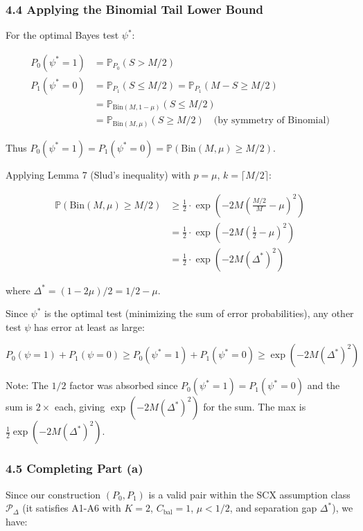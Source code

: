 \documentclass[
  12pt,
]{article}
\begin{document}
\subsubsection{4.4 Applying the Binomial Tail Lower
Bound}\label{applying-the-binomial-tail-lower-bound}

For the optimal Bayes test \(\psi^*\):

\[\begin{aligned}
P_0(\psi^* = 1) &= \mathbb{P}_{P_0}(S > M/2) \\
P_1(\psi^* = 0) &= \mathbb{P}_{P_1}(S \leq M/2) = \mathbb{P}_{P_1}(M - S \geq M/2) \\
&= \mathbb{P}_{\text{Bin}(M,1-\mu)}(S \leq M/2) \\
&= \mathbb{P}_{\text{Bin}(M,\mu)}(S \geq M/2) \quad \text{(by symmetry of Binomial)}
\end{aligned}\]

Thus
\(P_0(\psi^*=1) = P_1(\psi^*=0) = \mathbb{P}(\text{Bin}(M,\mu) \geq M/2)\).

Applying Lemma 7 (Slud's inequality) with \(p = \mu\),
\(k = \lceil M/2 \rceil\):

\[\begin{aligned}
\mathbb{P}(\text{Bin}(M,\mu) \geq M/2) &\geq \frac{1}{2} \cdot \exp\!\left(-2M\left(\frac{M/2}{M} - \mu\right)^2\right) \\
&= \frac{1}{2} \cdot \exp\!\left(-2M\left(\frac{1}{2} - \mu\right)^2\right) \\
&= \frac{1}{2} \cdot \exp\!\left(-2M(\Delta^*)^2\right)
\end{aligned}\]

where \(\Delta^* = (1-2\mu)/2 = 1/2 - \mu\).

Since \(\psi^*\) is the optimal test (minimizing the sum of error
probabilities), any other test \(\psi\) has error at least as large:

\[P_0(\psi=1) + P_1(\psi=0) \geq P_0(\psi^*=1) + P_1(\psi^*=0) \geq \exp(-2M(\Delta^*)^2)\]

Note: The \(1/2\) factor was absorbed since
\(P_0(\psi^*=1) = P_1(\psi^*=0)\) and the sum is \(2 \times\) each,
giving \(\exp(-2M(\Delta^*)^2)\) for the sum. The max is
\(\frac{1}{2}\exp(-2M(\Delta^*)^2)\).

\subsubsection{4.5 Completing Part (a)}\label{completing-part-a}

Since our construction \((P_0, P_1)\) is a valid pair within the SCX
assumption class \(\mathcal{P}_\Delta\) (it satisfies A1-A6 with
\(K=2\), \(C_{\text{bal}}=1\), \(\mu < 1/2\), and separation gap
\(\Delta^*\)), we have:
\end{document}
